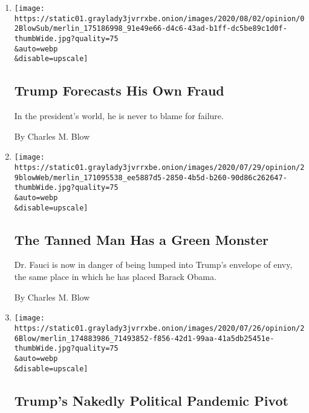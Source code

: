 \begin{enumerate}
\def\labelenumi{\arabic{enumi}.}
\item
  \href{/2020/08/02/opinion/trump-2020-election.html}{}

  \texttt{[image: https://static01.graylady3jvrrxbe.onion/images/2020/08/02/opinion/02BlowSub/merlin\_175186998\_91e49e66-d4c6-43ad-b1ff-dc5be89c1d0f-thumbWide.jpg?quality=75\\\&auto=webp\\\&disable=upscale]}

  \hypertarget{trump-forecasts-his-own-fraud}{%
  \subsection{Trump Forecasts His Own
  Fraud}\label{trump-forecasts-his-own-fraud}}

  In the president's world, he is never to blame for failure.

  By Charles M. Blow
\item
  \href{/2020/07/29/opinion/anthony-fauci-trump.html}{}

  \texttt{[image: https://static01.graylady3jvrrxbe.onion/images/2020/07/29/opinion/29blowWeb/merlin\_171095538\_ee5887d5-2850-4b5d-b260-90d86c262647-thumbWide.jpg?quality=75\\\&auto=webp\\\&disable=upscale]}

  \hypertarget{the-tanned-man-has-a-green-monster}{%
  \subsection{The Tanned Man Has a Green
  Monster}\label{the-tanned-man-has-a-green-monster}}

  Dr. Fauci is now in danger of being lumped into Trump's envelope of
  envy, the same place in which he has placed Barack Obama.

  By Charles M. Blow
\item
  \href{/2020/07/26/opinion/trump-coronavirus-convention.html}{}

  \texttt{[image: https://static01.graylady3jvrrxbe.onion/images/2020/07/26/opinion/26Blow/merlin\_174883986\_71493852-f856-42d1-99aa-41a5db25451e-thumbWide.jpg?quality=75\\\&auto=webp\\\&disable=upscale]}

  \hypertarget{trumps-nakedly-political-pandemic-pivot}{%
  \subsection{Trump's Nakedly Political Pandemic
  Pivot}\label{trumps-nakedly-political-pandemic-pivot}}


\end{enumerate}
